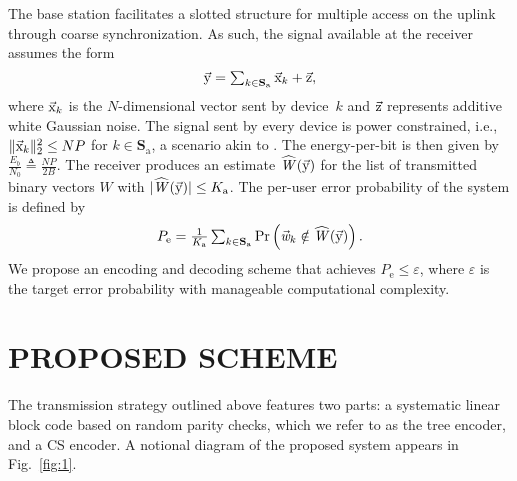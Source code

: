 \documentclass{article}
\begin{document}
The base station facilitates a slotted structure for multiple access on the uplink through coarse synchronization.
As such, the signal available at the receiver assumes the form
\[
\textstyle
\vec{\mathrm{y}}= \sum_{k \in \mathbf{S}_\mathrm{a}} \vec{\mathrm{x}}_k + \vec{\mathrm{z}},
\]
where $\vec{\mathrm{x}}_k$ is the $N$-dimensional vector sent by device~$k$ and $\vec{\mathrm{z}}$ represents additive white Gaussian noise.
The signal sent by every device is power constrained, i.e., $\| \vec{\mathrm{x}}_k \|_2^2 \le NP$ for $k \in \mathbf{S}_\mathrm{a}$, a scenario akin to \cite{polyanskiy2017perspective}.
The energy-per-bit is then given by $\frac{E_b}{N_0} \triangleq \frac{NP}{2B}$. The receiver produces an estimate $\widehat{\mathit{W}}(\vec{\mathrm{y}})$ for the list of transmitted binary vectors $\mathit{W}$ with $| \widehat{\mathit{W}}(\vec{\mathrm{y}}) | \le K_\text{a}$.
The per-user error probability of the system is defined by
\begin{equation}
P_\mathrm{e}
= \textstyle
\frac{1}{K_\text{a}}\sum_{k \in \mathbf{S}_\mathrm{a}}
\Pr \left( \vec{\mathit{w}}_k \notin \widehat{\mathit{W}}(\vec{\mathrm{y}}) \right) .
\end{equation}
We propose an encoding and decoding scheme that achieves $P_\mathrm{e} \le \varepsilon$, where $\varepsilon$ is the target error probability with manageable computational complexity.


\section{PROPOSED SCHEME}
\label{sec:proposedscheme}

%
The transmission strategy outlined above features two parts: a systematic linear block code based on random parity checks, which we refer to as the tree encoder, and a CS encoder.
A notional diagram of the proposed system appears in Fig.~\ref{fig:1}.
\end{document}
